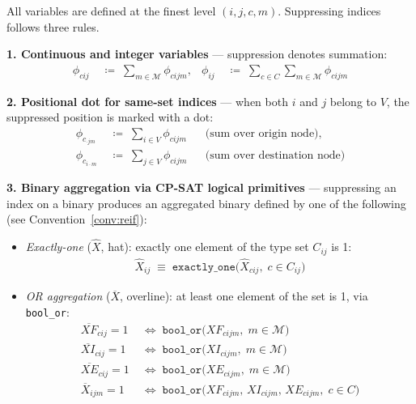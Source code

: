 \begin{convention}
\label{conv:notation}
All variables are defined at the finest level $(i,j,c,m)$.
Suppressing indices follows three rules.

\medskip
\noindent\textbf{1. Continuous and integer variables} ---
suppression denotes summation:
\begin{align*}
  \phi_{cij}
    &\;\coloneqq\; \sum_{m\in\mathcal{M}} \phi_{cijm},
  &
  \phi_{ij}
    &\;\coloneqq\;
      \sum_{c\in C}\sum_{m\in\mathcal{M}} \phi_{cijm}
\end{align*}

\medskip
\noindent\textbf{2. Positional dot for same-set indices} ---
when both $i$ and $j$ belong to $V$, the suppressed position is
marked with a dot:
\begin{align*}
  \phi_{c}_{\cdot j m}
    &\;\coloneqq\; \sum_{i\in V} \phi_{cijm}
    &&\text{(sum over origin node)}, \\
  \phi_{c}_{i \cdot m}
    &\;\coloneqq\; \sum_{j\in V} \phi_{cijm}
    &&\text{(sum over destination node)}
\end{align*}

\medskip
\noindent\textbf{3. Binary aggregation via CP-SAT logical
primitives} --- suppressing an index on a binary produces an
aggregated binary defined by one of the following (see
Convention~\ref{conv:reif}):
\begin{itemize}
  \item \textit{Exactly-one} ($\hat{X}$, hat): exactly one
        element of the type set $C_{ij}$ is 1:
        \begin{align*}
          \hat{X}_{ij}
            \;\equiv\;
            \texttt{exactly\_one}\bigl(\hat{X}_{cij},\;
            c \in C_{ij}\bigr)
        \end{align*}
  \item \textit{OR aggregation} ($\overline{X}$, overline):
        at least one element of the set is 1,
        via \texttt{bool\_or}:
        \begin{align*}
          \overline{XF}_{cij} = 1
            &\;\Leftrightarrow\;
            \texttt{bool\_or}\bigl(XF_{cijm},\;
            m\in\mathcal{M}\bigr) \\
          \overline{XI}_{cij} = 1
            &\;\Leftrightarrow\;
            \texttt{bool\_or}\bigl(XI_{cijm},\;
            m\in\mathcal{M}\bigr) \\
          \overline{XE}_{cij} = 1
            &\;\Leftrightarrow\;
            \texttt{bool\_or}\bigl(XE_{cijm},\;
            m\in\mathcal{M}\bigr) \\
          \overline{X}_{ijm} = 1
            &\;\Leftrightarrow\;
            \texttt{bool\_or}\bigl(
              XF_{cijm},\,XI_{cijm},\,XE_{cijm},\;
              c\in C\bigr)
        \end{align*}
\end{itemize}
\end{convention}

